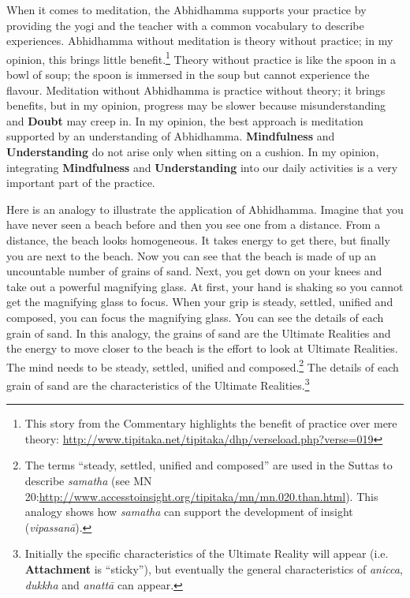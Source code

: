 When it comes to meditation, the Abhidhamma supports your practice by providing the yogi and the teacher with a common vocabulary to describe experiences. Abhidhamma without meditation is theory without practice; in my opinion, this brings little benefit.\footnote{This story from the Commentary highlights the benefit of practice over mere theory: \url{http://www.tipitaka.net/tipitaka/dhp/verseload.php?verse=019}} Theory without practice is like the spoon in a bowl of soup; the spoon is immersed in the soup but cannot experience the flavour. Meditation without Abhidhamma is practice without theory; it brings benefits, but in my opinion, progress may be slower because misunderstanding and \textbf{Doubt} may creep in. In my opinion, the best approach is meditation supported by an understanding of Abhidhamma. \textbf{Mindfulness} and \textbf{Understanding} do not arise only when sitting on a cushion. In my opinion, integrating \textbf{Mindfulness} and \textbf{Understanding} into our daily activities is a very important part of the practice.

Here is an analogy to illustrate the application of Abhidhamma. Imagine that you have never seen a beach before and then you see one from a distance. From a distance, the beach looks homogeneous. It takes energy to get there, but finally you are next to the beach. Now you can see that the beach is made of up an uncountable number of grains of sand. Next, you get down on your knees and take out a powerful magnifying glass. At first, your hand is shaking so you cannot get the magnifying glass to focus. When your grip is steady, settled, unified and composed, you can focus the magnifying glass. You can see the details of each grain of sand. In this analogy, the grains of sand are the Ultimate Realities and the energy to move closer to the beach is the effort to look at Ultimate Realities. The mind needs to be steady, settled, unified and composed.\footnote{The terms “steady, settled, unified and composed” are used in the Suttas  to describe \textit{samatha} (see MN 20:\newline \url{http://www.accesstoinsight.org/tipitaka/mn/mn.020.than.html}). This analogy shows how \textit{samatha} can support the development of insight (\textit{vipassanā}).} The details of each grain of sand are the characteristics of the Ultimate Realities.\footnote{Initially the specific characteristics of the Ultimate Reality will appear (i.e. \textbf{Attachment} is “sticky”), but eventually the general characteristics of \textit{anicca}, \textit{dukkha} and \textit{anattā} can appear.}

